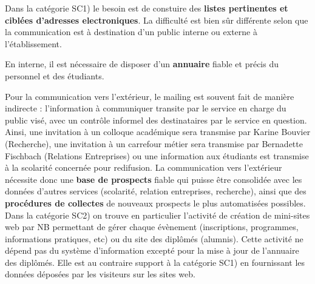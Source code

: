 \documentclass{book}
\begin{document}
Dans la catégorie SC1) le besoin est de constuire des \textbf{listes 
pertinentes et ciblées d'adresses electroniques}. La difficulté
est bien sûr différente selon que la communication est à destination
d'un public interne ou externe à l'établissement.

En interne, il est nécessaire de disposer d'un \textbf{annuaire}
fiable et précis du personnel et des étudiants. 

Pour la communication vers l'extérieur, le mailing est souvent 
fait de manière indirecte : l'information à communiquer transite par
le service en charge du public visé, avec un contrôle informel des 
destinataires par le service en question. Ainsi, une invitation à un 
colloque académique sera transmise par Karine Bouvier (Recherche),
une invitation à un carrefour métier sera transmise par Bernadette 
Fischbach (Relations Entreprises) ou une information aux étudiants
est transmise à la scolarité concernée pour redifusion. La communication 
vers l'extérieur nécessite donc une \textbf{base de prospects} fiable 
qui puisse être consolidée avec les données d'autres services (scolarité, 
relation entreprises, recherche), ainsi que des \textbf{procédures 
de collectes} de nouveaux prospects le plus automatisées possibles.\\

Dans la catégorie SC2) on trouve en particulier l'activité de création
de mini-sites web par NB permettant de gérer chaque évènement (inscriptions,
programmes, informations pratiques, etc) ou du site des diplômés (alumnis).
Cette activité ne dépend pas du système d'information excepté pour
la mise à jour de l'annuaire des diplômés. Elle est au contraire 
support à la catégorie SC1) en fournissant les données déposées par les
visiteurs sur les sites web.\\ 
\end{document}
